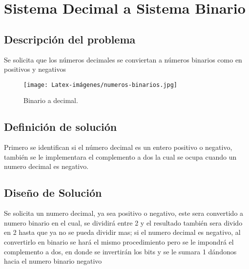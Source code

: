 \section{Sistema Decimal a Sistema Binario}

\subsection{Descripción del problema}
Se solicita que los números decimales se conviertan a números binarios como en positivos y negativos 
\begin {figure}[h!]
\centerline{\texttt{[image: Latex-imágenes/numeros-binarios.jpg]}}
\caption{Binario a decimal.}
\label{fig}
\end {figure}

\subsection{Definición de solución}
Primero se identifican si el número decimal es un entero positivo o negativo, también se le implementara el complemento a dos la cual se ocupa cuando un numero decimal es negativo.
\subsection{Diseño de Solución}
Se solicita un numero decimal, ya sea positivo o negativo, este  sera convertido a numero binario en el cual, se dividirá entre 2 y el resultado también sera divido en 2 hasta que ya no se pueda dividir mas; si el numero decimal es negativo, al convertirlo en binario se hará el mismo procedimiento pero se le impondrá el complemento a dos, en donde se invertirán los bits y se le sumara 1 dándonos hacia el numero binario negativo 
